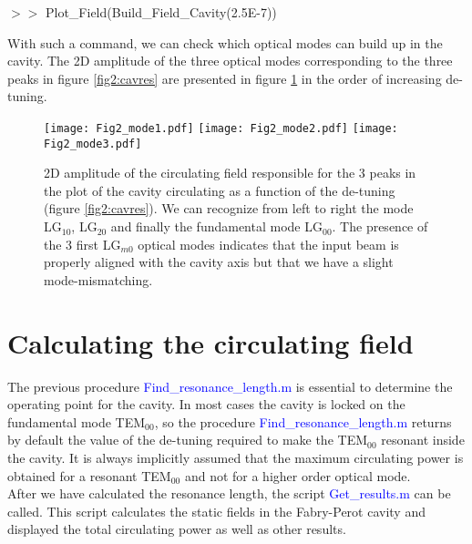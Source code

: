 \vspace*{0.5cm}

$>>$ Plot\_Field(Build\_Field\_Cavity(2.5E-7))

\vspace*{0.5cm}
\noindent With such a command, we can check which optical modes can build up in the cavity. The 2D amplitude of the three optical modes corresponding to the three peaks in figure \ref{fig2:cavres} are presented in figure \ref{fig2:HOM} in the order of increasing de-tuning.


\begin{figure}
\begin{center}
\texttt{[image: Fig2\_mode1.pdf]}\hfill
\texttt{[image: Fig2\_mode2.pdf]}\hfill
\texttt{[image: Fig2\_mode3.pdf]}\hfill
\end{center}
\caption{\label{fig2:HOM} 2D amplitude of the circulating field responsible for the 3 peaks in the plot of the cavity circulating as a function of the de-tuning (figure \ref{fig2:cavres}). We can recognize from left to right the mode LG$_{10}$, LG$_{20}$ and finally the fundamental mode LG$_{00}$. The presence of the 3 first LG$_{m0}$ optical modes indicates that the input beam is properly aligned with the cavity axis but that we have a slight mode-mismatching.}
\end{figure}

\section{Calculating the circulating field}
\label{sec2:4}
The previous procedure \textcolor{blue}{Find\_resonance\_length.m} is essential to determine the operating point for the cavity. In most cases the cavity is locked on the fundamental mode TEM$_{00}$, so the procedure \textcolor{blue}{Find\_resonance\_length.m} returns by default the value of the de-tuning required to make the TEM$_{00}$ resonant inside the cavity. It is always implicitly assumed that the maximum circulating power is obtained for a resonant TEM$_{00}$ and not for a higher order optical mode.\\

After we have calculated the resonance length, the script \textcolor{blue}{Get\_results.m} can be called. This script calculates the static fields in the Fabry-Perot cavity and displayed the total circulating power as well as other results.\\

